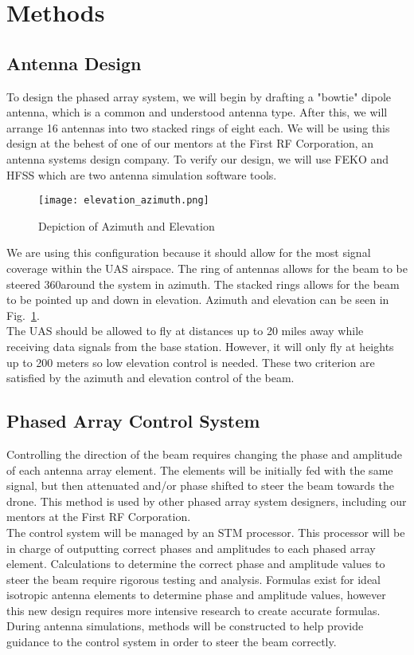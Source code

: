 \documentclass[UROP.tex]{subfiles}
\begin{document}
\bigskip
\section{\Large Methods}
\subsection{Antenna Design}
	To design the phased array system, we will begin by drafting a "bowtie" dipole antenna, which is a common and understood antenna type.  After this, we will arrange 16 antennas into two stacked rings of eight each.  We will be using this design at the behest of one of our mentors at the First RF Corporation, an antenna systems design company.  To verify our design, we will use FEKO and HFSS which are two antenna simulation software tools. \\
	
	\begin{figure}[H]
		\centering
		\texttt{[image: elevation\_azimuth.png]}
		\caption{ Depiction of Azimuth and Elevation \label{fig:elevation_azimuth}}
	\end{figure}
	
	We are using this configuration because it should allow for the most signal coverage within the UAS airspace.  The ring of antennas allows for the beam to be steered 360\deg around the system in azimuth.  The stacked rings allows for the beam to be pointed up and down in elevation.  Azimuth and elevation can be seen in Fig.~\ref{fig:elevation_azimuth}.  \\
	
	The UAS should be allowed to fly at distances up to 20 miles away while receiving data signals from the base station.  However, it will only fly at heights up to 200 meters so low elevation control is needed.  These two criterion are satisfied by the azimuth and elevation control of the beam.  \\
	
\subsection{Phased Array Control System}
	Controlling the direction of the beam requires changing the phase and amplitude of each antenna array element.  The elements will be initially fed with the same signal, but then attenuated and/or phase shifted to steer the beam towards the drone.  This method is used by other phased array system designers, including our mentors at the First RF Corporation.  \\
	
	The control system will be managed by an STM processor.  This processor will be in charge of outputting correct phases and amplitudes to each phased array element.  Calculations to determine the correct phase and amplitude values to steer the beam require rigorous testing and analysis.  Formulas exist for ideal isotropic antenna elements to determine phase and amplitude values, however this new design requires more intensive research to create accurate formulas.  During antenna simulations, methods will be constructed to help provide guidance to the control system in order to steer the beam correctly. \\
	
\end{document}
